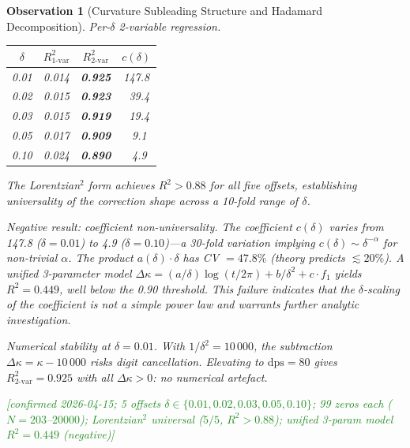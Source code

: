 \documentclass[11pt, a4paper]{article}
\theoremstyle{definition}
\theoremstyle{plain}
\newtheorem{observation}[theorem]{Observation}
\begin{document}
\begin{observation}[Curvature Subleading Structure and Hadamard Decomposition]
\emph{Per-$\delta$ 2-variable regression.}\;
\begin{center}
\small
\begin{tabular}{@{} c c c c @{}}
\toprule
$\delta$ & $R^2_\text{1-var}$ & $R^2_\text{2-var}$ & $c(\delta)$ \\
\midrule
0.01 & 0.014 & \textbf{0.925} & 147.8 \\
0.02 & 0.015 & \textbf{0.923} & \ 39.4 \\
0.03 & 0.015 & \textbf{0.919} & \ 19.4 \\
0.05 & 0.017 & \textbf{0.909} & \  9.1 \\
0.10 & 0.024 & \textbf{0.890} & \  4.9 \\
\bottomrule
\end{tabular}
\end{center}
The Lorentzian$^2$ \emph{form} achieves $R^2 > 0.88$ for all five offsets,
establishing universality of the correction \emph{shape} across a
10-fold range of $\delta$.

\emph{Negative result: coefficient non-universality.}\;
The coefficient $c(\delta)$ varies from 147.8 ($\delta = 0.01$) to 4.9
($\delta = 0.10$)---a 30-fold variation implying
$c(\delta) \sim \delta^{-\alpha}$ for non-trivial $\alpha$.
The product $a(\delta)\cdot\delta$ has CV $= 47.8\%$
(theory predicts $\lesssim 20\%$).  A unified 3-parameter model
$\Delta\kappa = (a/\delta)\log(t/2\pi) + b/\delta^2 + c\cdot f_1$
yields $R^2 = 0.449$, well below the 0.90 threshold.
This failure indicates that the $\delta$-scaling of the coefficient is
not a simple power law and warrants further analytic investigation.

\emph{Numerical stability at $\delta = 0.01$.}\;
With $1/\delta^2 = 10\,000$, the subtraction $\Delta\kappa = \kappa - 10\,000$
risks digit cancellation.  Elevating to $\text{dps} = 80$ gives
$R^2_{2\text{-var}} = 0.925$ with all $\Delta\kappa > 0$: no numerical artefact.

\textcolor{ForestGreen}{[confirmed 2026-04-15; 5 offsets $\delta\in\{0.01,0.02,0.03,0.05,0.10\}$;
99 zeros each ($N{=}203$--$20000$);
Lorentzian$^2$ universal ($5/5$, $R^2{>}0.88$);
unified 3-param model $R^2{=}0.449$ (negative)]}


\end{observation}
\end{document}
